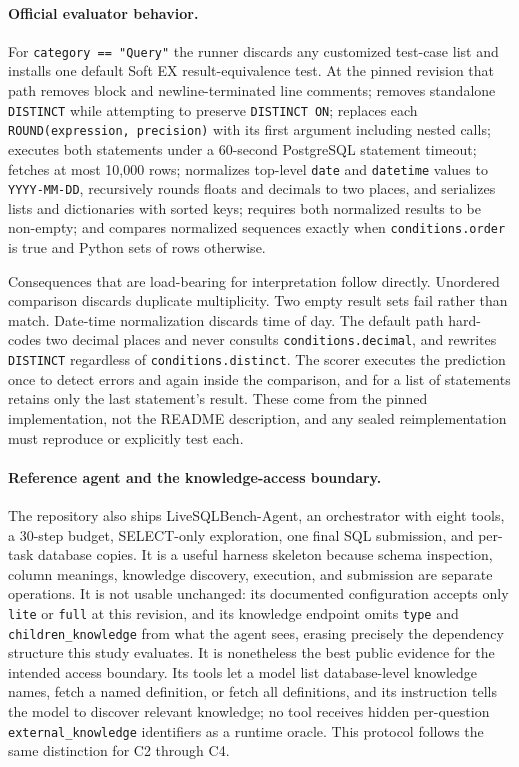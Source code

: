 \paragraph{Official evaluator behavior.}
For \texttt{category == "Query"} the runner discards any customized test-case
list and installs one default Soft EX result-equivalence test. At the pinned
revision that path removes block and newline-terminated line comments; removes
standalone \texttt{DISTINCT} while attempting to preserve \texttt{DISTINCT ON};
replaces each \texttt{ROUND(expression, precision)} with its first argument
including nested calls; executes both statements under a 60-second PostgreSQL
statement timeout; fetches at most 10,000 rows; normalizes top-level
\texttt{date} and \texttt{datetime} values to \texttt{YYYY-MM-DD}, recursively
rounds floats and decimals to two places, and serializes lists and dictionaries
with sorted keys; requires both normalized results to be non-empty; and compares
normalized sequences exactly when \texttt{conditions.order} is true and Python
sets of rows otherwise.

Consequences that are load-bearing for interpretation follow directly. Unordered
comparison discards duplicate multiplicity. Two empty result sets fail rather
than match. Date-time normalization discards time of day. The default path
hard-codes two decimal places and never consults \texttt{conditions.decimal}, and
rewrites \texttt{DISTINCT} regardless of \texttt{conditions.distinct}. The scorer
executes the prediction once to detect errors and again inside the comparison,
and for a list of statements retains only the last statement's result. These come
from the pinned implementation, not the README description, and any sealed
reimplementation must reproduce or explicitly test each.

\paragraph{Reference agent and the knowledge-access boundary.}
The repository also ships LiveSQLBench-Agent, an orchestrator with eight tools, a
30-step budget, SELECT-only exploration, one final SQL submission, and per-task
database copies. It is a useful harness skeleton because schema inspection,
column meanings, knowledge discovery, execution, and submission are separate
operations. It is not usable unchanged: its documented configuration accepts only
\texttt{lite} or \texttt{full} at this revision, and its knowledge endpoint omits
\texttt{type} and \texttt{children\_knowledge} from what the agent sees, erasing
precisely the dependency structure this study evaluates. It is nonetheless the
best public evidence for the intended access boundary. Its tools let a model list
database-level knowledge names, fetch a named definition, or fetch all
definitions, and its instruction tells the model to discover relevant knowledge;
no tool receives hidden per-question \texttt{external\_knowledge} identifiers as
a runtime oracle. This protocol follows the same distinction for C2 through C4.

